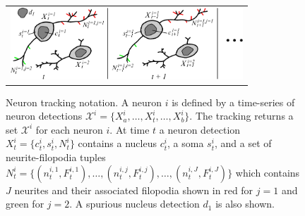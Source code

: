 \begin{figure}[t]
  \begin{center}
       \begin{tabular}{@{\hspace{-1mm}}c}
        \includegraphics[width = 87mm] {images/neurondrawing.pdf}\\ [-2.4ex]
       \end{tabular} 
    \caption{ \footnotesize   Neuron  tracking  notation.    A
        neuron $i$  is defined by  a time-series of  neuron detections
        $\mathcal{X}^i     =     \{X_{a}^i,\ldots,X_t^i,\ldots,X_{b}^i
        \}$.  The  tracking returns  a  set  $\mathcal{X}^i$ for  each
        neuron $i$.  At time $t$ a neuron detection $X_t^i = \{ c_t^i,
        s_t^i, N_t^i  \}$ contains a nucleus $c_t^i$,  a soma $s_t^i$,
        and    a  set of   neurite-filopodia    tuples    $N_t^i     =    \{(
        n_t^{i,1},F_t^{i,1}),   \ldots,(n_t^{i,j},F_t^{i,j}),  \ldots,
        (n_t^{i,J},F_t^{i,J})  \}$  which  contains $J$  neurites  and
        their associated  filopodia shown in  red for $j=1$  and green
        for  $j=2$. A spurious nucleus  detection  $d_1$ is also shown.}
    \label{fig:notation}
  \end{center}
\vspace{-8mm}
\end{figure}







